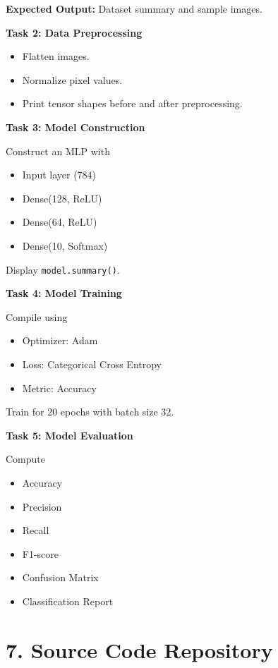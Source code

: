 \documentclass[11pt]{article}
\begin{document}
\textbf{Expected Output:}
Dataset summary and sample images.

\bigskip

\textbf{Task 2: Data Preprocessing}

\begin{itemize}
\item Flatten images.
\item Normalize pixel values.
\item Print tensor shapes before and after preprocessing.
\end{itemize}

\bigskip

\textbf{Task 3: Model Construction}

Construct an MLP with

\begin{itemize}
\item Input layer (784)
\item Dense(128, ReLU)
\item Dense(64, ReLU)
\item Dense(10, Softmax)
\end{itemize}

Display \texttt{model.summary()}.

\bigskip

\textbf{Task 4: Model Training}

Compile using

\begin{itemize}
\item Optimizer: Adam
\item Loss: Categorical Cross Entropy
\item Metric: Accuracy
\end{itemize}

Train for 20 epochs with batch size 32.

\bigskip

\textbf{Task 5: Model Evaluation}

Compute

\begin{itemize}
\item Accuracy
\item Precision
\item Recall
\item F1-score
\item Confusion Matrix
\item Classification Report
\end{itemize}
\section*{7. Source Code Repository}
\end{document}

